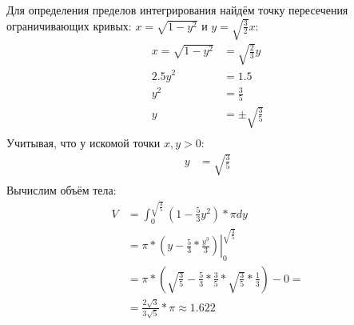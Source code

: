 \documentclass[12pt, a4paper]{article}
\begin{document}
Для определения пределов интегрирования найдём точку пересечения ограничивающих кривых: $x=\sqrt{1-y^2}$ и $y=\sqrt{\frac{3}{2}}x$:
\begin{equation*}
\begin{aligned}
x =\sqrt{1-y^2} &= \sqrt{\frac{2}{3}}y\\
2.5y^2 &=1.5\\
y^2&=\frac{3}{5}\\
y&=\pm\sqrt{\frac{3}{5}}\\
\end{aligned}
\end{equation*}
Учитывая, что у искомой точки $x,y > 0$:
\begin{equation*}
\begin{aligned}
y &=\sqrt{\frac{3}{5}}\\
\end{aligned}
\end{equation*}
Вычислим объём тела:
\begin{equation*}
\begin{aligned}
V &= \int_{0}^{\sqrt{\frac{3}{5}}}  \left(1-\frac{5}{3}y^2\right)*\pi dy\\
&=\left.\pi * \left(y-\frac{5}{3}*\frac{y^3}{3}\right) \right|_{0}^{\sqrt{\frac{3}{5}}}\\
&= \pi * \left(\sqrt{\frac{3}{5}}-\frac{5}{3}* \frac{3}{5} *\sqrt{\frac{3}{5}} * \frac{1}{3}\right) - 0=\\
&=\frac{2\sqrt{3}}{3\sqrt{5}}*\pi \approx 1.622
\end{aligned}
\end{equation*}
\end{document}
